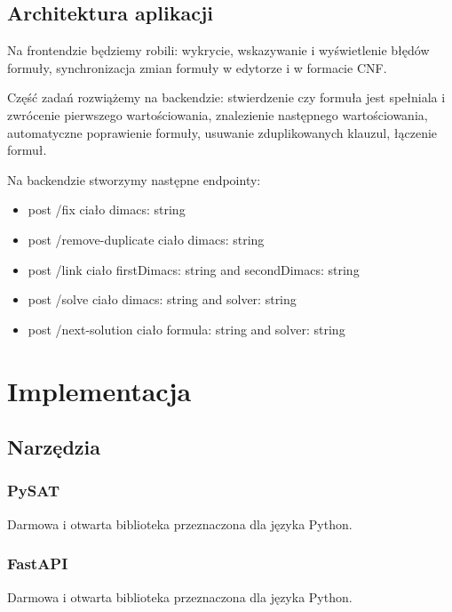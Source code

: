 \documentclass[a4paper,12pt,oneside]{book}
\theoremstyle{definition}
\begin{document}
\section{Architektura aplikacji}

Na frontendzie będziemy robili: wykrycie, wskazywanie i wyświetlenie błędów formuły, synchronizacja zmian formuły w edytorze i w formacie CNF.

Część zadań rozwiążemy na backendzie: stwierdzenie czy formuła jest spełniala i zwrócenie pierwszego wartościowania, znalezienie następnego wartościowania, 
automatyczne poprawienie formuły, usuwanie zduplikowanych klauzul, łączenie formuł.

Na backendzie stworzymy następne endpointy:

\begin{itemize}
    \item post /fix ciało dimacs: string 
    \item post /remove-duplicate ciało dimacs: string
    \item post  /link  ciało firstDimacs: string and secondDimacs: string
    \item post /solve ciało dimacs: string and solver: string
    \item post /next-solution ciało formula: string and solver: string
\end{itemize}

\chapter{Implementacja}

\section{Narzędzia}

\subsection{PySAT}

Darmowa i otwarta biblioteka przeznaczona dla języka Python.

\lipsum[1]

\lipsum[2]

\lipsum[3]

\subsection{FastAPI}

Darmowa i otwarta biblioteka przeznaczona dla języka Python.
\end{document}
